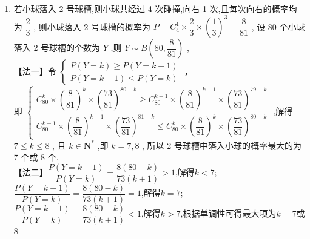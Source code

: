 \begin{enumerate}
\begin{jieda}
\begin{enumerate}
        \item 若小球落入 2 号球槽,则小球共经过 4 次碰撞,向右 1 次,且每次向右的概率均为 $\dfrac{2}{3}$ ,
        则小球落入 2 号球槽的概率为 $P = {{C}}_{4}^{1} \times  \dfrac{2}{3} \times  {\left( \dfrac{1}{3}\right) }^{3} = \dfrac{8}{81}$ ,
        设 80 个小球落入 2 号球槽的个数为 $Y$ ,则 $Y \sim  B\left( {{80},\dfrac{8}{81}}\right)$ ,\\
        【法一】令 $\left\{  \begin{array}{l} P\left( {Y = k}\right)  \geq  P\left( {Y = k + 1}\right) \\  P\left( {Y = k - 1}\right)  \leq  P\left( {Y = k}\right)  \end{array}\right.$ ，\\即 $\left\{  \begin{array}{l} {{C}}_{80}^{k} \times  {\left( \dfrac{8}{81}\right) }^{k} \times  {\left( \dfrac{73}{81}\right) }^{{80} - k} \geq  {{C}}_{80}^{k + 1} \times  {\left( \dfrac{8}{81}\right) }^{k + 1} \times  {\left( \dfrac{73}{81}\right) }^{{79} - k} \\  {{C}}_{80}^{k - 1} \times  {\left( \dfrac{8}{81}\right) }^{k - 1} \times  {\left( \dfrac{73}{81}\right) }^{{81} - k} \leq  {{C}}_{80}^{k} \times  {\left( \dfrac{8}{81}\right) }^{k} \times  {\left( \dfrac{73}{81}\right) }^{{80} - k} \end{array}\right.$ ,解得 $7 \leq  k \leq  8$ ,
        且 $k \in  {\mathbf{N}}^{ * }$ ,即 $k = 7,8$ ,
        所以 2 号球槽中落入小球的概率最大的为 7 个或 8 个.\\

        【法二】$\dfrac{P(Y=k+1)}{P(Y=k)}=\dfrac{8(80-k)}{73(k+1)}>1$,解得$k<7$;\\
        $\dfrac{P(Y=k+1)}{P(Y=k)}=\dfrac{8(80-k)}{73(k+1)}=1$,解得$k=7$;\\
        $\dfrac{P(Y=k+1)}{P(Y=k)}=\dfrac{8(80-k)}{73(k+1)}<1$,解得$k>7$,根据单调性可得最大项为$k=7$或$8$
    \end{enumerate}
\end{jieda}


    
\end{enumerate}


\clearpage
